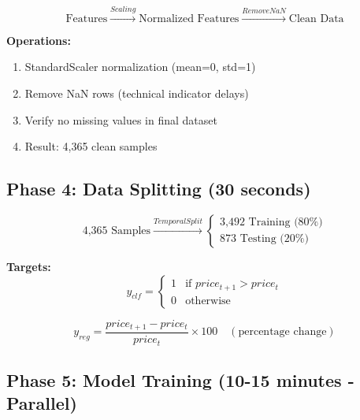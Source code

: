\begin{equation}
\text{Features} \xrightarrow{Scaling} \text{Normalized Features} \xrightarrow{Remove NaN} \text{Clean Data}
\end{equation}

\textbf{Operations:}
\begin{enumerate}
    \item StandardScaler normalization (mean=0, std=1)
    \item Remove NaN rows (technical indicator delays)
    \item Verify no missing values in final dataset
    \item Result: 4,365 clean samples
\end{enumerate}

\subsection{Phase 4: Data Splitting (30 seconds)}

\begin{equation}
\text{4,365 Samples} \xrightarrow{Temporal Split} \begin{cases}
\text{3,492 Training (80\%)} \\
\text{873 Testing (20\%)}
\end{cases}
\end{equation}

\textbf{Targets:}
\begin{equation}
y_{clf} = \begin{cases} 1 & \text{if } price_{t+1} > price_t \\ 0 & \text{otherwise} \end{cases}
\end{equation}

\begin{equation}
y_{reg} = \frac{price_{t+1} - price_t}{price_t} \times 100 \quad (\text{percentage change})
\end{equation}

\subsection{Phase 5: Model Training (10-15 minutes - Parallel)}

